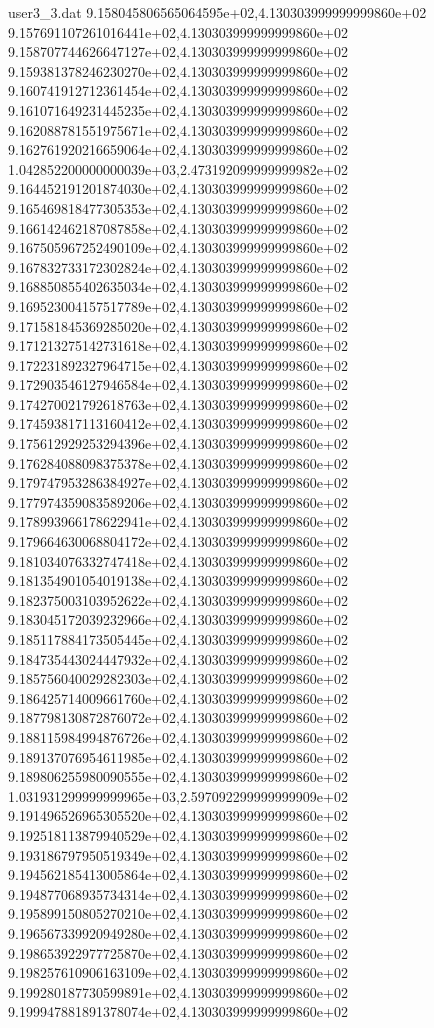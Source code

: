 \begin{filecontents}{user3_3.dat}
9.158045806565064595e+02,4.130303999999999860e+02
9.157691107261016441e+02,4.130303999999999860e+02
9.158707744626647127e+02,4.130303999999999860e+02
9.159381378246230270e+02,4.130303999999999860e+02
9.160741912712361454e+02,4.130303999999999860e+02
9.161071649231445235e+02,4.130303999999999860e+02
9.162088781551975671e+02,4.130303999999999860e+02
9.162761920216659064e+02,4.130303999999999860e+02
1.042852200000000039e+03,2.473192099999999982e+02
9.164452191201874030e+02,4.130303999999999860e+02
9.165469818477305353e+02,4.130303999999999860e+02
9.166142462187087858e+02,4.130303999999999860e+02
9.167505967252490109e+02,4.130303999999999860e+02
9.167832733172302824e+02,4.130303999999999860e+02
9.168850855402635034e+02,4.130303999999999860e+02
9.169523004157517789e+02,4.130303999999999860e+02
9.171581845369285020e+02,4.130303999999999860e+02
9.171213275142731618e+02,4.130303999999999860e+02
9.172231892327964715e+02,4.130303999999999860e+02
9.172903546127946584e+02,4.130303999999999860e+02
9.174270021792618763e+02,4.130303999999999860e+02
9.174593817113160412e+02,4.130303999999999860e+02
9.175612929253294396e+02,4.130303999999999860e+02
9.176284088098375378e+02,4.130303999999999860e+02
9.179747953286384927e+02,4.130303999999999860e+02
9.177974359083589206e+02,4.130303999999999860e+02
9.178993966178622941e+02,4.130303999999999860e+02
9.179664630068804172e+02,4.130303999999999860e+02
9.181034076332747418e+02,4.130303999999999860e+02
9.181354901054019138e+02,4.130303999999999860e+02
9.182375003103952622e+02,4.130303999999999860e+02
9.183045172039232966e+02,4.130303999999999860e+02
9.185117884173505445e+02,4.130303999999999860e+02
9.184735443024447932e+02,4.130303999999999860e+02
9.185756040029282303e+02,4.130303999999999860e+02
9.186425714009661760e+02,4.130303999999999860e+02
9.187798130872876072e+02,4.130303999999999860e+02
9.188115984994876726e+02,4.130303999999999860e+02
9.189137076954611985e+02,4.130303999999999860e+02
9.189806255980090555e+02,4.130303999999999860e+02
1.031931299999999965e+03,2.597092299999999909e+02
9.191496526965305520e+02,4.130303999999999860e+02
9.192518113879940529e+02,4.130303999999999860e+02
9.193186797950519349e+02,4.130303999999999860e+02
9.194562185413005864e+02,4.130303999999999860e+02
9.194877068935734314e+02,4.130303999999999860e+02
9.195899150805270210e+02,4.130303999999999860e+02
9.196567339920949280e+02,4.130303999999999860e+02
9.198653922977725870e+02,4.130303999999999860e+02
9.198257610906163109e+02,4.130303999999999860e+02
9.199280187730599891e+02,4.130303999999999860e+02
9.199947881891378074e+02,4.130303999999999860e+02

\end{filecontents}
